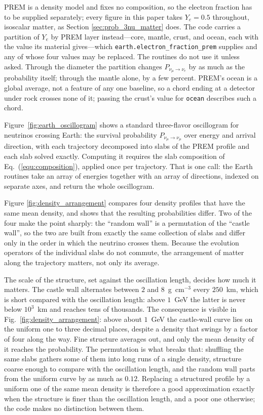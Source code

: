 \documentclass[final,5p,times,twocolumn,sort,compress]{elsarticle}
\newcommand{\eq}{Eq.}
\newcommand{\fig}{Fig.}
\newcommand{\equ}[1]{\eq~(\ref{equ:#1})}
\newcommand{\figu}[1]{\fig~\ref{fig:#1}}
\begin{document}
PREM is a density model and fixes no composition, so the electron fraction has to be supplied separately; every figure in this paper takes $Y_e = 0.5$ throughout, isoscalar matter, as Section \ref{sec:prob_3nu_matter} does.  The code carries a partition of $Y_e$ by PREM layer instead---core, mantle, crust, and ocean, each with the value its material gives---which {\tt earth.electron\_fraction\_prem} supplies and any of whose four values may be replaced.  The routines do not use it unless asked.  Through the diameter the partition changes $P_{\nu_\mu \to \nu_e}$ by as much as the probability itself; through the mantle alone, by a few percent.  PREM's ocean is a global average, not a feature of any one baseline, so a chord ending at a detector under rock crosses none of it; passing the crust's value for {\tt ocean} describes such a chord.

Figure~\ref{fig:earth_oscillogram} shows a standard three-flavor oscillogram for neutrinos crossing Earth: the survival probability $P_{\nu_\mu \to \nu_\mu}$ over energy and arrival direction, with each trajectory decomposed into slabs of the PREM profile and each slab solved exactly.  Computing it requires the slab composition of \equ{composition}, applied once per trajectory.  That is one call: the Earth routines take an array of energies together with an array of directions, indexed on separate axes, and return the whole oscillogram.

Figure \ref{fig:density_arrangement} compares four density profiles that have the same mean density, and shows that the resulting probabilities differ.  Two of the four make the point sharply: the ``random wall'' is a permutation of the ``castle wall'', so the two are built from exactly the same collection of slabs and differ only in the order in which the neutrino crosses them.  Because the evolution operators of the individual slabs do not commute, the arrangement of matter along the trajectory matters, not only its average.  

The scale of the structure, set against the oscillation length, decides how much it matters.  The castle wall alternates between $2$ and $8$~g~cm$^{-3}$ every $250$~km, which is short compared with the oscillation length: above $1$~GeV the latter is never below $10^3$~km and reaches tens of thousands.  The consequence is visible in \figu{density_arrangement}: above about $1$~GeV the castle-wall curve lies on the uniform one to three decimal places, despite a density that swings by a factor of four along the way.  Fine structure averages out, and only the mean density of it reaches the probability.  The permutation is what breaks that: shuffling the same slabs gathers some of them into long runs of a single density, structure coarse enough to compare with the oscillation length, and the random wall parts from the uniform curve by as much as $0.12$.  Replacing a structured profile by a uniform one of the same mean density is therefore a good approximation exactly when the structure is finer than the oscillation length, and a poor one otherwise; the code makes no distinction between them.
\end{document}
